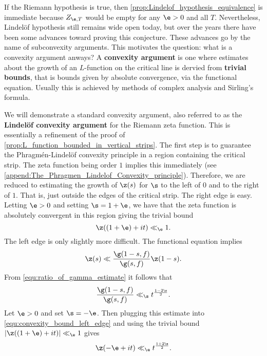     If the Riemann hypothesis is true, then \cref{prop:Lindelof_hypothesis_equivalence} is immediate because $Z_{\e,T}$ would be empty for any $\e > 0$ and all $T$. Nevertheless, Lindel\"of hypothesis still remains wide open today, but over the years there have been some advances toward proving this conjecture. These advances go by the name of subconvexity arguments. This motivates the question: what is a convexity argument anways? A \textbf{convexity argument} is one where estimates about the growth of an $L$-function on the critical line is dervied from \textbf{trivial bounds}, that is bounds given by absolute convergence, via the functional equation. Usually this is achieved by methods of complex analysis and Sirling's formula.

    We will demonstrate a standard convexity argument, also referred to as the \textbf{Lindel\"of convexity argument} for the Riemann zeta function. This is essentially a refinement of the proof of \cref{prop:L_function_bounded_in_vertical_strips}. The first step is to guarantee the Phragm\'en-Lindel\"of convexity principle in a region containing the critical strip. The zeta function being order $1$ implies this immediately (see \cref{append:The_Phragmen_Lindelof_Convexity_principle}). Therefore, we are reduced to estimating the growth of $\z(s)$ for $\s$ to the left of $0$ and to the right of $1$. That is, just outside the edges of the critical strip. The right edge is easy. Letting $\e > 0$ and setting $\s = 1+\e$, we have that the zeta function is absolutely convergent in this region giving the trivial bound
    \begin{equation}\label{equ:convexity_bound_1}
      \z((1+\e)+it) \ll_{\e} 1.
    \end{equation}
    The left edge is only slightly more difficult. The functional equation implies
    \begin{equation}\label{equ:convexity_bound_left_edge}
      \z(s) \ll \frac{\g(1-s,f)}{\g(s,f)}\z(1-s).
    \end{equation}
    From \cref{equ:ratio_of_gamma_estimate} it follows that
    \[
      \frac{\g(1-s,f)}{\g(s,f)} \ll_{\s} t^{\frac{1-2\s}{2}}.
    \]
    Let $\e > 0$ and set $\s = -\e$. Then plugging this estimate into \cref{equ:convexity_bound_left_edge} and using the trivial bound $|\z((1+\e)+it)| \ll_{\e} 1$ gives
    \begin{equation}\label{equ:convexity_bound_2}
      \z(-\e+it) \ll_{\e} t^{\frac{1+2\e}{2}}.
    \end{equation}
